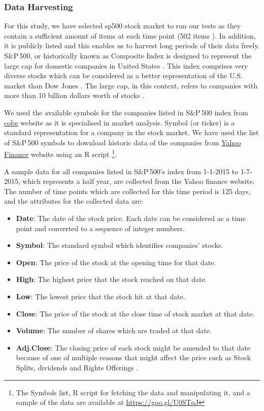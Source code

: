 \subsubsection{Data Harvesting}

For this study, we have selected \acrfull{sp500} stock market to run our tests as they contain a sufficient amount of items at each time point (502 items \cite{Goings2014}). In addition, it is publicly listed and this enables us to harvest long periods of their data freely. S\&P\,500, or historically known as Composite Index \cite{TheEditorsofEncyclopædiaBritannica} is designed to represent the large cap for domestic companies in United States \cite{Britannica2015}. This index comprises very diverse stocks which can be considered as a better representation of the U.S. market than Dow Jones . The large cap, in this context, refers to companies with more than 10 billion dollars worth of stocks \cite{Editors2016}.

We used the available symbols for the companies listed in S\&P\,500 index from \href{http://www.cboe.com/products/snp500.aspx}{cobe} website as it is specialised in market analysis. Symbol (or ticker) is a standard representation for a company in the stock market. We have used the list of S\&P\,500 symbols to download historic data of the companies from \href{https://uk.finance.yahoo.com/}{Yahoo Finance} website using an R script \footnote{The Symbols list, R script for fetching the data and manipulating it, and a sample of the data are available at \href{https://goo.gl/U0STqJ}{https://goo.gl/U0STqJ}}.

A sample data for all companies listed in S\&P\,500's index from 1-1-2015 to 1-7-2015, which represents a half year, are collected from the Yahoo finance website. The number of time points which are collected for this time period is 125 days, and the attributes for the collected data are:

\begin{itemize}
	\item \textbf{Date}: The date of the stock price. Each date can be considered as a time point and converted to a sequence of integer numbers.
	\item \textbf{Symbol}: The standard symbol which identifies companies' stocks.
	\item \textbf{Open}: The price of the stock at the opening time for that date.
	\item \textbf{High}: The highest price that the stock reached on that date.
	\item \textbf{Low}: The lowest price that the stock hit at that date.
	\item \textbf{Close}: The price of the stock at the close time of stock market at that date.
	\item \textbf{Volume}: The number of shares which are traded at that date.
	\item \textbf{Adj.Close}: The closing price of each stock might be amended to that date because of one of multiple reasons that might affect the price such as Stock Splits, dividends and Rights Offerings \cite{EditorsInvestopedia2016}. 
\end{itemize}

